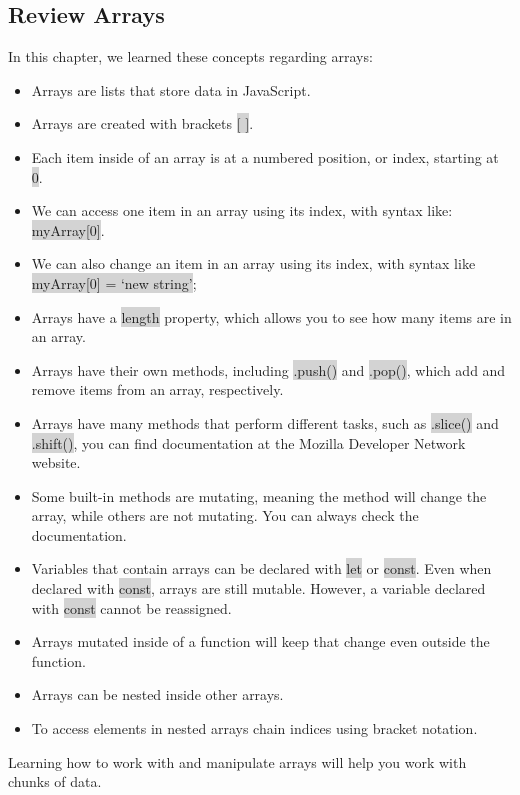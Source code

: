 \documentclass[11pt]{article}
\begin{document}
\subsection{Review Arrays}
In this chapter, we learned these concepts regarding arrays:
\begin{itemize}[leftmargin = *]
\item Arrays are lists that store data in JavaScript.
\item Arrays are created with brackets \colorbox{lightgray}{$[$ $]$}.
\item Each item inside of an array is at a numbered position, or index, starting at \colorbox{lightgray}{0}.
\item We can access one item in an array using its index, with syntax like: \colorbox{lightgray}{myArray[0]}.
\item We can also change an item in an array using its index, with syntax like \colorbox{lightgray}{myArray[0] = `new string'};
\item Arrays have a \colorbox{lightgray}{length} property, which allows you to see how many items are in an array.
\item Arrays have their own methods, including \colorbox{lightgray}{.push()} and \colorbox{lightgray}{.pop()}, which add and remove items from an array, respectively.
\item Arrays have many methods that perform different tasks, such as \colorbox{lightgray}{.slice()} and \colorbox{lightgray}{.shift()}, you can find documentation at the Mozilla Developer Network website.
\item Some built-in methods are mutating, meaning the method will change the array, while others are not mutating. You can always check the documentation.
\item Variables that contain arrays can be declared with \colorbox{lightgray}{let} or \colorbox{lightgray}{const}. Even when declared with \colorbox{lightgray}{const}, arrays are still mutable. However, a variable declared with \colorbox{lightgray}{const} cannot be reassigned.
\item Arrays mutated inside of a function will keep that change even outside the function.
\item Arrays can be nested inside other arrays.
\item To access elements in nested arrays chain indices using bracket notation.
\end{itemize}
Learning how to work with and manipulate arrays will help you work with chunks of data. 
\end{document}
